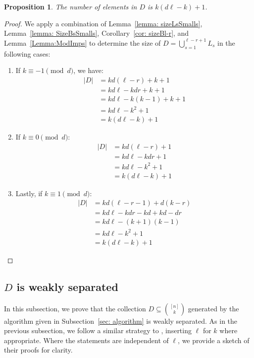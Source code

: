 \documentclass[11pt]{amsart}
\theoremstyle{plain}
\newtheorem{proposition}[theorem]{Proposition}
\theoremstyle{definition}
\begin{document}
\begin{proposition}\label{prop: cardinality_n=dl}  The number of elements in $D$ is $k(d\ell-k)+1$. 
\end{proposition} 
\begin{proof}
We apply a combination of Lemma~\ref{lemma: sizeLsSmalls}, Lemma~\ref{lemma: SizeBsSmalls}, Corollary~\ref{cor: sizeBl-r}, and Lemma~\ref{Lemma:ModImps} to determine the size of $D=\bigcup_{s=1}^{\ell-r+1}L_s$ in the following cases:
\begin{enumerate}
    \item If $k \equiv -1 \pmod d$, we have: 
\begin{align*}
    |D|&= kd(\ell-r)+k+1 \\
    &= kd\ell-kdr+k+1 \\
    &= kd\ell-k(k-1)+k+1 \\
    &= kd\ell-k^2+1 \\
    &= k(d\ell-k)+1
\end{align*}
\item If $k \equiv 0 \pmod d$: 
\begin{align*}
    |D|&= kd(\ell-r)+1 \\
    &= kd\ell-kdr+1 \\
    &= kd\ell-k^2+1 \\
    &= k(d\ell-k)+1
\end{align*}
\item Lastly, if $k \equiv 1 \pmod d$: 
\begin{align*}
 |D|   &= kd(\ell-r-1)+d(k-r) \\
    &= kd \ell - kdr - kd+kd-dr \\
    &= kd\ell - (k+1)(k-1) \\
    &= kd\ell-k^2+1 \\
    &= k(d\ell-k)+1
\end{align*}
\end{enumerate}

\end{proof}

\subsection{$D$ is weakly separated}

In this subsection, we prove that the collection $D\subseteq {[n] \choose k}$ generated by the algorithm given in Subsection~\ref{sec: algorithm} is weakly separated. As in the previous subsection, we follow a similar strategy to \cite{PasqTZ2019}, inserting $\ell$ for $k$ where appropriate. Where the statements are independent of $\ell$, we provide a sketch of their proofs for clarity.
\end{document}
